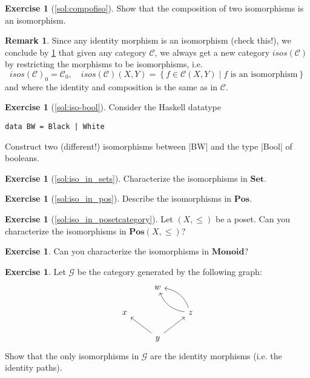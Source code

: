 \documentclass[a4paper,10pt]{scrartcl}
\theoremstyle{plain}
\theoremstyle{definition}
\newtheorem{rem}[thm]{Remark}
\newtheorem{exer}[thm]{Exercise}
\newcommand{\Cat}[1]{\mathcal{#1}}
\newcommand{\CC}{\Cat{C}}
\newcommand{\Catb}[1]{\mathbf{#1}}
\newcommand{\SET}{\Catb{Set}}
\newcommand{\POS}{\Catb{Pos}}
\newcommand{\MON}{\Catb{Monoid}}
\newcommand{\Ob}[1]{{#1}_0}
\newcommand{\CHom}[3]{{#1}(#2,#3)}
\begin{document}
\begin{exer}[\cref{sol:compofiso}]\label{exer:compofiso}
  Show that the composition of two isomorphisms is an isomorphism.
\end{exer}
\begin{rem} 
Since any identity morphism is an isomorphism (check this!), we conclude by \cref{exer:compofiso} that given any category $\CC$, we always get a new category $isos(\CC)$ by restricting the morphisms to be isomorphisms, i.e. \[
\Ob{isos(\CC)} = \Ob{\CC}, \quad \CHom{isos(\CC)}{X}{Y} = \left\{f \in \CHom{\CC}{X}{Y} \mid f \text{ is an isomorphism}\right\}
\] 
and where the identity and composition is the same as in $\CC$.
\end{rem}


\begin{exer}[\cref{sol:iso-bool}]\label{exer:iso-bool}
  Consider the Haskell datatype
\begin{lstlisting}
data BW = Black | White
\end{lstlisting}
Construct two (different!) isomorphisms between |BW| and the type |Bool| of booleans.
\end{exer}

\begin{exer}[\cref{sol:iso_in_sets}]\label{exer:iso_in_sets}
  Characterize the isomorphisms in $\SET$.
\end{exer}

\begin{exer}[\cref{sol:iso_in_pos}]\label{exer:iso_in_pos}
  Describe the isomorphisms in $\POS$.
\end{exer}

\begin{exer}[\cref{sol:iso_in_posetcategory}]\label{exer:iso_in_posetcategory} Let $(X,\leq)$ be a poset. Can you characterize the isomorphisms in $\POS(X,\leq)$?
\end{exer}

\begin{exer} Can you characterize the isomorphisms in $\MON$?
\end{exer}

\begin{exer} Let $\mathcal{G}$ be the category generated by the following graph:
\[
\begin{tikzcd}
& w & \\
x & & z \arrow[lu, bend left] \arrow[lu,bend right] \\
& y \arrow[lu] \arrow[ru] &
\end{tikzcd}
\]
Show that the only isomorphisms in $\mathcal{G}$ are the identity morphisms (i.e. the identity paths).
\end{exer}
\end{document}
